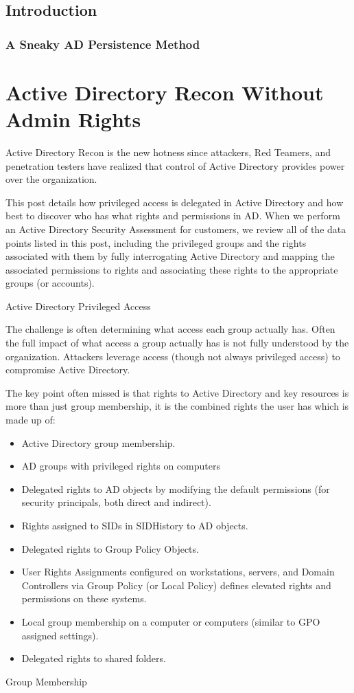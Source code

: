 \subsection{Introduction}

\subsubsection{A Sneaky AD Persistence Method}

\section{Active Directory Recon Without Admin Rights}

Active Directory Recon is the new hotness since attackers, Red Teamers, and penetration testers have realized that control of Active Directory provides power over the organization.

This post details how privileged access is delegated in Active Directory and how best to discover who has what rights and permissions in AD. When we perform an Active Directory Security Assessment for customers, we review all of the data points listed in this post, including the privileged groups and the rights associated with them by fully interrogating Active Directory and mapping the associated permissions to rights and associating these rights to the appropriate groups (or accounts).

Active Directory Privileged Access

The challenge is often determining what access each group actually has. Often the full impact of what access a group actually has is not fully understood by the organization. Attackers leverage access (though not always privileged access) to compromise Active Directory.

The key point often missed is that rights to Active Directory and key resources is more than just group membership, it is the combined rights the user has which is made up of:

\begin{itemize}
    \item Active Directory group membership.
    \item AD groups with privileged rights on computers
    \item Delegated rights to AD objects by modifying the default permissions (for security principals, both direct and indirect).
    \item Rights assigned to SIDs in SIDHistory to AD objects.
    \item Delegated rights to Group Policy Objects.
    \item User Rights Assignments configured on workstations, servers, and Domain Controllers via Group Policy (or Local Policy) defines elevated rights and permissions on these systems.
    \item Local group membership on a computer or computers (similar to GPO assigned settings).
    \item Delegated rights to shared folders.
\end{itemize}
Group Membership

